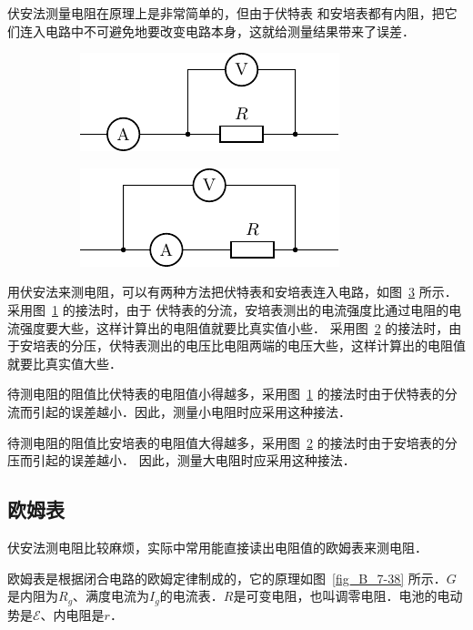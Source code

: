 伏安法测量电阻在原理上是非常简单的，但由于伏特表
和安培表都有内阻，把它们连入电路中不可避免地要改变电路本身，这就给测量结果带来了误差．
\begin{figure}[htbp]
    \centering
    \begin{subfigure}{0.4\linewidth}
        \centering
        \includegraphics{fig/B/7-37a.pdf}
        \caption{}\label{fig_B_7-37a}
    \end{subfigure}
    \hfil
    \begin{subfigure}{0.4\linewidth}
        \centering
        \includegraphics{fig/B/7-37b.pdf}
        \caption{}\label{fig_B_7-37b}
    \end{subfigure}
    \caption{}\label{fig_B_7-37}
\end{figure}

用伏安法来测电阻，可以有两种方法把伏特表和安培表连入电路，如图~\ref{fig_B_7-37} 所示．采用图~\ref{fig_B_7-37a} 的接法时，由于
伏特表的分流，安培表测出的电流强度比通过电阻的电流强度要大些，这样计算出的电阻值就要比真实值小些．
采用图~\ref{fig_B_7-37b} 的接法时，由于安培表的分压，伏特表测出的电压比电阻两端的电压大些，这样计算出的电阻值就要比真实值大些．

待测电阻的阻值比伏特表的电阻值小得越多，采用图~\ref{fig_B_7-37a} 的接法时由于伏特表的分流而引起的误差越小．因此，测量小电阻时应采用这种接法．

待测电阻的阻值比安培表的电阻值大得越多，采用图~\ref{fig_B_7-37b} 的接法时由于安培表的分压而引起的误差越小．
因此，测量大电阻时应采用这种接法．

\subsection{欧姆表}


伏安法测电阻比较麻烦，实际中常用能直接读出电阻值的欧姆表来测电阻．

欧姆表是根据闭合电路的欧姆定律制成的，它的原理如图~\ref{fig_B_7-38} 所示．$G$是内阻为$R_g$、满度电流为$I_g$的电流表．$R$是可变电阻，也叫调零电阻．电池的电动势是$\mathcal{E}$、内电阻是$r$．

